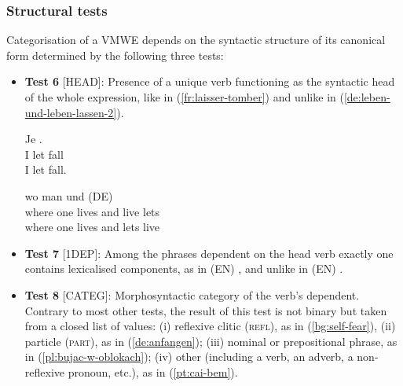 \documentclass[output=paper,modfonts]{langscibook}
\begin{document}
\subsubsection{Structural tests}
\label{sec:structure}
%
Categorisation of a VMWE %
depends on the syntactic structure of its canonical form determined by the following three tests:
\begin{itemize}
\item[]\textbf{Test 6} [HEAD]: Presence of a unique verb functioning as the syntactic head of the whole expression, like in (\ref{fr:laisser-tomber}) 
and unlike in (\ref{de:leben-und-leben-lassen-2}).

\ea \label{fr:laisser-tomber}
\settowidth {} 
\gll Je  .\\
I let fall \\ 
\glt I let fall. 
\z

\ea \label{de:leben-und-leben-lassen-2}
\settowidth {} 
\gll wo man  und   (DE)\\
where one lives and live lets \\
\glt where one lives and lets live 
\z

\item[]\textbf{Test 7} [1DEP]: 
Among the phrases dependent on the head verb exactly one contains lexicalised components, 
as in (EN) , and unlike in (EN) . 

\item[]\textbf{Test 8} [CATEG]: Morphosyntactic category of the verb's dependent. 
Contrary to most other tests, the result of this test is not binary but taken from a closed list of values: (i) reflexive clitic (\textsc{refl}), as in (\ref{bg:self-fear}), 
(ii) particle (\textsc{part}), as in (\ref{de:anfangen});
(iii) nominal or prepositional phrase, as in (\ref{pl:bujac-w-oblokach}); 
(iv) other (including a verb, an adverb, a non-reflexive pronoun, etc.), as in (\ref{pt:cai-bem}).


\end{itemize}
\end{document}
